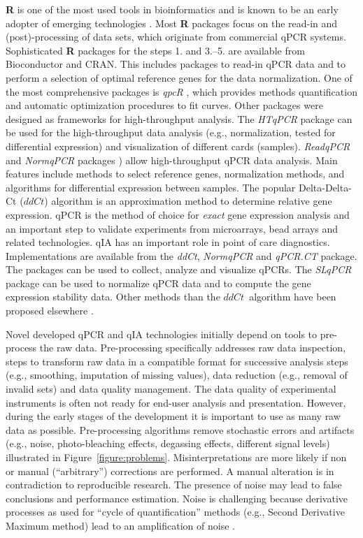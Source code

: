 \documentclass[twocolumn]{bmcart}%
\begin{document}
  \textbf{R} is one of the most used tools in bioinformatics and is known to be 
an early adopter of emerging technologies \cite{pabinger_2014}. Most \textbf{R} 
packages focus on the read-in and (post)-processing of data sets, which 
originate from commercial qPCR systems. Sophisticated \textbf{R} packages for 
the steps 1. and 3.--5. are available from Bioconductor and CRAN. This includes 
packages to read-in qPCR data \cite{blagodatskikh_2014} and to perform a 
selection of optimal reference genes for the data normalization. One of the most 
comprehensive packages is \emph{qpcR} \cite{ritz_2008}, which provides methods 
quantification and automatic optimization procedures to fit curves. Other 
packages were designed as frameworks for high-throughput analysis. The 
\emph{HTqPCR} package \cite{Dvinge_2009} can be used for the high-throughput 
data analysis (e.g., normalization, tested for differential expression) and 
visualization of different cards (samples). \emph{ReadqPCR} and \emph{NormqPCR} 
packages \cite{perkins_2012}) allow high-throughput qPCR data analysis. Main 
features include methods to select reference genes, normalization methods, and 
algorithms for differential expression between samples. The popular 
Delta-Delta-Ct ($ddCt$) algorithm \cite{livak_2001} is an approximation method 
to determine relative gene expression. qPCR is the method of choice for 
\emph{exact} gene expression analysis and an important step to validate 
experiments from microarrays, bead arrays and related technologies. qIA has an 
important role in point of care diagnostics. Implementations are available from 
the \emph{ddCt}, \emph{NormqPCR} and \emph{qPCR.CT} package. The packages can be 
used to collect, analyze and visualize qPCRs. The \emph{SLqPCR} package can be 
used to normalize qPCR data and to compute the gene expression stability data. 
Other methods than the $ddCt$~algorithm have been proposed elsewhere 
\cite{heckmann_2011}.

Novel developed qPCR and qIA technologies initially depend on tools to 
pre-process the raw data. Pre-processing specifically addresses raw data 
inspection, steps to transform raw data in a compatible format for successive 
analysis steps (e.g., smoothing, imputation of missing values), data reduction 
(e.g., removal of invalid sets) and data quality management. The data quality of 
experimental instruments is often not ready for end-user analysis and 
presentation. However, during the early stages of the development it is 
important to use as many raw data as possible. Pre-processing algorithms remove 
stochastic errors and artifacts (e.g., noise, photo-bleaching effects, degassing 
effects, different signal levels) illustrated in Figure~\ref{figure:problems}. 
Misinterpretations are more likely if non or manual (``arbitrary'') corrections 
are performed. A manual alteration is in contradiction to reproducible research. 
The presence of noise may lead to false conclusions and performance estimation. 
Noise is challenging because derivative processes as used for ``cycle of 
quantification'' methods (e.g., Second Derivative Maximum method) lead to an 
amplification of noise \cite{roediger_RJ_2013, larionov_2005, tuomi_2010, 
ruijter_2013, tellinghuisen_2014}.
\end{document}
